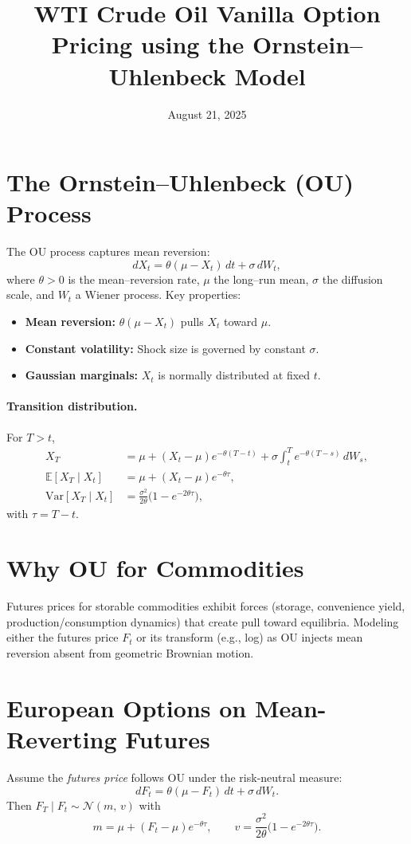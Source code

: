 \documentclass[12pt]{article}
\title{WTI Crude Oil Vanilla Option Pricing using the Ornstein--Uhlenbeck Model}
\author{}
\date{August 21, 2025}
\begin{document}
\maketitle


\section{The Ornstein--Uhlenbeck (OU) Process}
The OU process captures mean reversion:
\begin{equation}
  dX_t = \theta(\mu - X_t)\,dt + \sigma\, dW_t,
\end{equation}
where $\theta>0$ is the mean--reversion rate, $\mu$ the long--run mean, $\sigma$ the diffusion scale, and $W_t$ a Wiener process. Key properties:
\begin{itemize}
  \item \textbf{Mean reversion:} $\theta(\mu - X_t)$ pulls $X_t$ toward $\mu$.
  \item \textbf{Constant volatility:} Shock size is governed by constant $\sigma$.
  \item \textbf{Gaussian marginals:} $X_t$ is normally distributed at fixed $t$.
\end{itemize}

\paragraph{Transition distribution.} For $T>t$,
\begin{align}
  X_T &= \mu + (X_t-\mu)e^{-\theta (T-t)} + 
  \sigma \int_t^T e^{-\theta (T-s)}\, dW_s, \\
  \mathbb{E}[X_T\mid X_t] &= \mu + (X_t-\mu)e^{-\theta \tau},\\
  \mathrm{Var}[X_T\mid X_t] &= \frac{\sigma^2}{2\theta}\bigl(1-e^{-2\theta \tau}\bigr),
\end{align}
with $\tau=T-t$.

\section{Why OU for Commodities}
Futures prices for storable commodities exhibit forces (storage, convenience yield, production/consumption dynamics) that create pull toward equilibria. Modeling either the futures price $F_t$ or its transform (e.g., log) as OU injects mean reversion absent from geometric Brownian motion.

\section{European Options on Mean-Reverting Futures}
Assume the \emph{futures price} follows OU under the risk-neutral measure:
\begin{equation}
  dF_t = \theta(\mu - F_t)\,dt + \sigma\, dW_t.
\end{equation}
Then $F_T\mid F_t \sim \mathcal{N}\!\left(m,\,v\right)$ with
\begin{equation}
  m=\mu+(F_t-\mu)e^{-\theta \tau},\qquad
  v=\frac{\sigma^2}{2\theta}\bigl(1-e^{-2\theta \tau}\bigr).
\end{equation}
\end{document}
